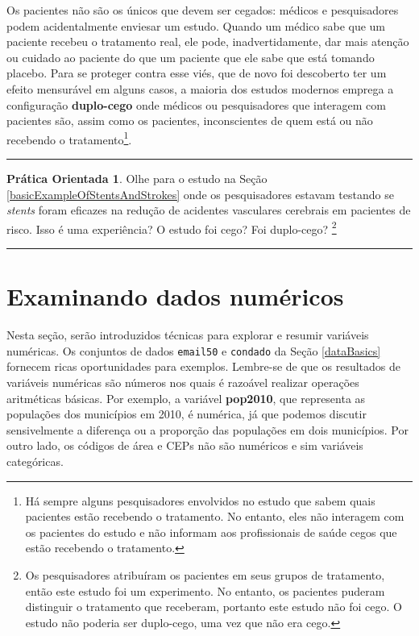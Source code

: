 \documentclass[
]{book}
\theoremstyle{definition}
\theoremstyle{definition}
\theoremstyle{definition}
\newtheorem{exercise}{Prática Orientada}[chapter]
\theoremstyle{definition}
\theoremstyle{remark}
\begin{document}
Os pacientes não são os únicos que devem ser cegados: médicos e pesquisadores podem acidentalmente enviesar um estudo. Quando um médico sabe que um paciente recebeu o tratamento real, ele pode, inadvertidamente, dar mais atenção ou cuidado ao paciente do que um paciente que ele sabe que está tomando placebo. Para se proteger contra esse viés, que de novo foi descoberto ter um efeito mensurável em alguns casos, a maioria dos estudos modernos emprega a configuração \textbf{duplo-cego} onde médicos ou pesquisadores que interagem com pacientes são, assim como os pacientes, inconscientes de quem está ou não recebendo o tratamento\footnote{Há sempre alguns pesquisadores envolvidos no estudo que sabem quais pacientes estão recebendo o tratamento. No entanto, eles não interagem com os pacientes do estudo e não informam aos profissionais de saúde cegos que estão recebendo o tratamento.}.

\begin{center}\rule{0.5\linewidth}{0.5pt}\end{center}

\begin{exercise}
\protect\hypertarget{exr:unnamed-chunk-14}{}{\label{exr:unnamed-chunk-14} }Olhe para o estudo na Seção \ref{basicExampleOfStentsAndStrokes} onde os pesquisadores estavam testando se \emph{stents} foram eficazes na redução de acidentes vasculares cerebrais em pacientes de risco. Isso é uma experiência? O estudo foi cego? Foi duplo-cego? \footnote{Os pesquisadores atribuíram os pacientes em seus grupos de tratamento, então este estudo foi um experimento. No entanto, os pacientes puderam distinguir o tratamento que receberam, portanto este estudo não foi cego. O estudo não poderia ser duplo-cego, uma vez que não era cego.}
\end{exercise}

\begin{center}\rule{0.5\linewidth}{0.5pt}\end{center}

\hypertarget{numericalData}{%
\section{Examinando dados numéricos}\label{numericalData}}

Nesta seção, serão introduzidos técnicas para explorar e resumir variáveis numéricas. Os conjuntos de dados \texttt{email50} e \texttt{condado} da Seção \ref{dataBasics} fornecem ricas oportunidades para exemplos. Lembre-se de que os resultados de variáveis numéricas são números nos quais é razoável realizar operações aritméticas básicas. Por exemplo, a variável \textbf{pop2010}, que representa as populações dos municípios em 2010, é numérica, já que podemos discutir sensivelmente a diferença ou a proporção das populações em dois municípios. Por outro lado, os códigos de área e CEPs não são numéricos e sim variáveis categóricas.
\end{document}
